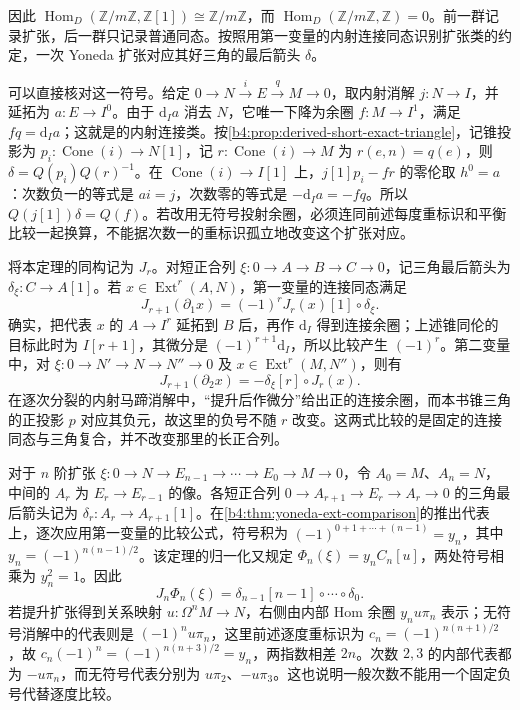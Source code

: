 因此 \(\operatorname{Hom}_D(\mathbb Z/m\mathbb Z,\mathbb Z[1])\cong\mathbb Z/m\mathbb Z\)，而 \(\operatorname{Hom}_D(\mathbb Z/m\mathbb Z,\mathbb Z)=0\)。前一群记录扩张，后一群只记录普通同态。按照用第一变量的内射连接同态识别扩张类的约定，一次 Yoneda 扩张对应其好三角的最后箭头 \(\delta\)。

\ProseParagraphBreak
可以直接核对这一符号。给定 \(0\to N\xrightarrow{i}E\xrightarrow{q}M\to0\)，取内射消解 \(j:N\to I\)，并延拓为 \(a:E\to I^0\)。由于 \(\mathrm{d}_Ia\) 消去 \(N\)，它唯一下降为余圈 \(f:M\to I^1\)，满足 \(fq=\mathrm{d}_Ia\)；这就是的内射连接类。按\cref{b4:prop:derived-short-exact-triangle}，记锥投影为 \(p_i:\operatorname{Cone}(i)\to N[1]\)，记 \(r:\operatorname{Cone}(i)\to M\) 为 \(r(e,n)=q(e)\)，则 \(\delta=Q(p_i)Q(r)^{-1}\)。在 \(\operatorname{Cone}(i)\to I[1]\) 上，\(j[1]p_i-fr\) 的零伦取 \(h^0=a\)：次数负一的等式是 \(ai=j\)，次数零的等式是 \(-\mathrm{d}_Ia=-fq\)。所以 \(Q(j[1])\delta=Q(f)\)。若改用无符号投射余圈，必须连同前述每度重标识和平衡比较一起换算，不能据次数一的重标识孤立地改变这个扩张对应。

将本定理的同构记为 \(J_r\)。对短正合列 \(\xi:0\to A\to B\to C\to0\)，记三角最后箭头为 \(\delta_\xi:C\to A[1]\)。若 \(x\in\operatorname{Ext}^r(A,N)\)，第一变量的连接同态满足
\[
	J_{r+1}(\partial_1x)=(-1)^rJ_r(x)[1]\circ\delta_\xi.
\]
确实，把代表 \(x\) 的 \(A\to I^r\) 延拓到 \(B\) 后，再作 \(\mathrm{d}_I\) 得到连接余圈；上述锥同伦的目标此时为 \(I[r+1]\)，其微分是 \((-1)^{r+1}\mathrm{d}_I\)，所以比较产生 \((-1)^r\)。第二变量中，对 \(\xi:0\to N'\to N\to N''\to0\) 及 \(x\in\operatorname{Ext}^r(M,N'')\)，则有
\[
	J_{r+1}(\partial_2x)=-\delta_\xi[r]\circ J_r(x).
\]
在逐次分裂的内射马蹄消解中，“提升后作微分”给出正的连接余圈，而本书锥三角的正投影 \(p\) 对应其负元，故这里的负号不随 \(r\) 改变。这两式比较的是固定的连接同态与三角复合，并不改变那里的长正合列。

对于 \(n\) 阶扩张 \(\xi:0\to N\to E_{n-1}\to\cdots\to E_0\to M\to0\)，令 \(A_0=M\)、\(A_n=N\)，中间的 \(A_r\) 为 \(E_r\to E_{r-1}\) 的像。各短正合列 \(0\to A_{r+1}\to E_r\to A_r\to0\) 的三角最后箭头记为 \(\delta_r:A_r\to A_{r+1}[1]\)。在\cref{b4:thm:yoneda-ext-comparison}的推出代表上，逐次应用第一变量的比较公式，符号积为 \((-1)^{0+1+\cdots+(n-1)}=y_n\)，其中 \(y_n=(-1)^{n(n-1)/2}\)。该定理的归一化又规定 \(\Phi_n(\xi)=y_nC_n[u]\)，两处符号相乘为 \(y_n^2=1\)。因此
\[
	J_n\Phi_n(\xi) =\delta_{n-1}[n-1]\circ\cdots\circ\delta_0.
\]
若提升扩张得到关系映射 \(u:\Omega^nM\to N\)，右侧由内部 Hom 余圈 \(y_nu\pi_n\) 表示；无符号消解中的代表则是 \((-1)^nu\pi_n\)，这里前述逐度重标识为 \(c_n=(-1)^{n(n+1)/2}\)，故 \(c_n(-1)^n=(-1)^{n(n+3)/2}=y_n\)，两指数相差 \(2n\)。次数 \(2,3\) 的内部代表都为 \(-u\pi_n\)，而无符号代表分别为 \(u\pi_2\)、\(-u\pi_3\)。这也说明一般次数不能用一个固定负号代替逐度比较。

